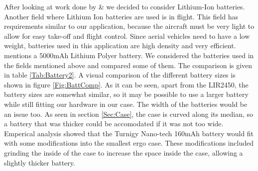 After looking at work done by \cite{Web:ShimmerHome} \& \cite{drennan2010assessment} we decided to consider Lithium-Ion batteries. Another field where Lithium Ion batteries are used is in flight. This field has requirements similar to our application, because the aircraft must be very light to allow for easy take-off and flight control. Since aerial vehicles need to have a low weight, batteries used in this application are high density and very efficient. \cite{neitzel2011mobile} mentions a 5000mAh Lithium Polyer battery. We considered the batteries used in the fields mentioned above and compared some of them. The comparison is given in table \ref{Tab:Battery2}. A visual comparison of the different battery sizes is shown in figure \ref{Fig:BattComp}. As it can be seen, apart from the LIR2450, the battery sizes are somewhat similar,
so it may be possible to use a larger battery while still fitting our hardware in our case.
The width of the batteries would be an issue too.
As seen in section \ref{Sec:Case},
the case is curved along its median,
so a battery that was thicker could be accomodated if it was not too wide.
Emperical analysis showed that the Turnigy Nano-tech 160mAh battery
would fit with some modifications into the smallest ergo case.
These modifications included grinding the inside of the case to increase the space inside the case,
allowing a slightly thicker battery.



